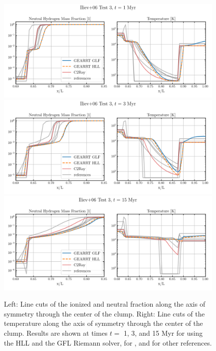 \begin{figure}
 \centering
 \includegraphics[width=\textwidth]{figures/RHD/Iliev3/output_0001-Profiles.png}\\%
 \includegraphics[width=\textwidth]{figures/RHD/Iliev3/output_0003-Profiles.png}\\%
 \includegraphics[width=\textwidth]{figures/RHD/Iliev3/output_0015-Profiles.png}%
 \caption{
Left: Line cuts of the ionized and neutral fraction along the axis of symmetry through the center
of the clump. Right: Line cuts of the temperature along the axis of symmetry through the center of
the clump. Results are shown at times $t=$ 1, 3, and 15 Myr for \GEARRT using the HLL and the GFL
Riemann solver, for , and for other references.
 }
\label{fig:iliev3-profiles}
\end{figure}



